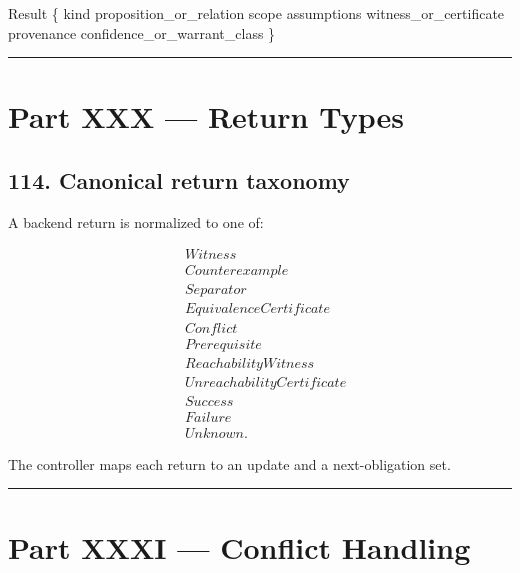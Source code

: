 \documentclass[
]{article}
\newenvironment{Shaded}{}{}
\newcommand{\NormalTok}[1]{#1}
\begin{document}
\begin{Shaded}
\begin{Highlighting}[]
\NormalTok{Result \{}
\NormalTok{    kind}
\NormalTok{    proposition\_or\_relation}
\NormalTok{    scope}
\NormalTok{    assumptions}
\NormalTok{    witness\_or\_certificate}
\NormalTok{    provenance}
\NormalTok{    confidence\_or\_warrant\_class}
\NormalTok{\}}
\end{Highlighting}
\end{Shaded}

\begin{center}\rule{0.5\linewidth}{0.5pt}\end{center}

\section{Part XXX --- Return Types}\label{part-xxx-return-types}

\subsection{114. Canonical return
taxonomy}\label{canonical-return-taxonomy}

A backend return is normalized to one of:

\[
\boxed{
\begin{aligned}
&Witness\\
&Counterexample\\
&Separator\\
&EquivalenceCertificate\\
&Conflict\\
&Prerequisite\\
&ReachabilityWitness\\
&UnreachabilityCertificate\\
&Success\\
&Failure\\
&Unknown.
\end{aligned}
}
\]

The controller maps each return to an update and a next-obligation set.

\begin{center}\rule{0.5\linewidth}{0.5pt}\end{center}

\section{Part XXXI --- Conflict
Handling}\label{part-xxxi-conflict-handling}
\end{document}
